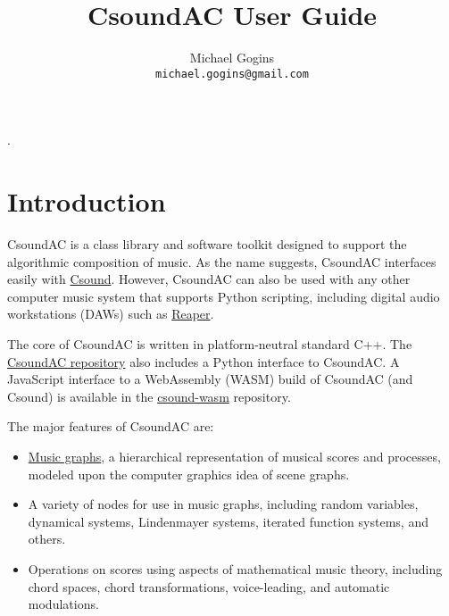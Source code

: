 \documentclass[letterpaper,10pt,DIV=12]{scrartcl}
\begin{document}
.

\title{CsoundAC User Guide}
\author{Michael Gogins \\ \texttt{michael.gogins@gmail.com}}
\maketitle

\section{Introduction}

CsoundAC is a class library and software toolkit designed to support the algorithmic composition of music. As the name suggests, CsoundAC interfaces easily with \href{https://csound.com/}{ Csound}. However, CsoundAC can also be used with any other computer music system that supports Python scripting, including digital audio workstations (DAWs) such as \href{https://www.reaper.fm/}{Reaper}.

The core of CsoundAC is written in platform-neutral standard C++. The \href{https://github.com/gogins/csound-ac}{CsoundAC repository} also includes a Python interface to CsoundAC. A JavaScript interface to a WebAssembly (WASM) build of CsoundAC (and Csound) is available in the \href{https://github.com/gogins/csound-wasm}{csound-wasm} repository. 

The major features of CsoundAC are:

\begin{itemize}
\item  \href{https://quod.lib.umich.edu/i/icmc/bbp2372.1998.298/1}{Music graphs}, a hierarchical representation of musical scores and processes, modeled upon the computer graphics idea of scene graphs. 

\item A variety of nodes for use in music graphs, including random variables, dynamical systems, Lindenmayer systems, iterated function systems, and others.

\item Operations on scores using aspects of mathematical music theory, including chord spaces, chord transformations, voice-leading, and automatic modulations. 
\end{itemize}
\end{document}
